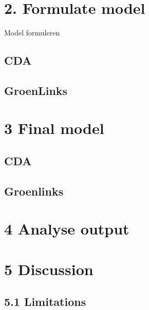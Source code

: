 \documentclass[11pt,]{article}
\begin{document}
\section{2. Formulate model}\label{formulate-model}

Model formuleren

\subsection{CDA}\label{cda-1}

\subsection{GroenLinks}\label{groenlinks-1}

\section{3 Final model}\label{final-model}

\subsection{CDA}\label{cda-2}

\subsection{Groenlinks}\label{groenlinks-2}

\section{4 Analyse output}\label{analyse-output}

\section{5 Discussion}\label{discussion}

\subsection{5.1 Limitations}\label{limitations}
\end{document}
